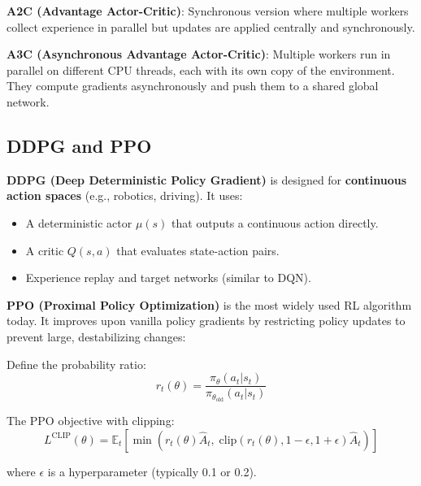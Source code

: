 \documentclass[11pt,a4paper]{article}
\begin{document}
\textbf{A2C (Advantage Actor-Critic)}: Synchronous version where multiple workers collect experience in parallel but updates are applied centrally and synchronously.

\textbf{A3C (Asynchronous Advantage Actor-Critic)}: Multiple workers run in parallel on different CPU threads, each with its own copy of the environment. They compute gradients asynchronously and push them to a shared global network.

\subsection{DDPG and PPO}

\textbf{DDPG (Deep Deterministic Policy Gradient)} is designed for \textbf{continuous action spaces} (e.g., robotics, driving). It uses:
\begin{itemize}
    \item A deterministic actor $\mu(s)$ that outputs a continuous action directly.
    \item A critic $Q(s, a)$ that evaluates state-action pairs.
    \item Experience replay and target networks (similar to DQN).
\end{itemize}

\textbf{PPO (Proximal Policy Optimization)} is the most widely used RL algorithm today. It improves upon vanilla policy gradients by restricting policy updates to prevent large, destabilizing changes:

Define the probability ratio:
\[
r_t(\theta) = \frac{\pi_\theta(a_t | s_t)}{\pi_{\theta_{\text{old}}}(a_t | s_t)}
\]

The PPO objective with clipping:
\[
L^{\text{CLIP}}(\theta) = \mathbb{E}_t \left[ \min\left( r_t(\theta) \hat{A}_t, \; \text{clip}(r_t(\theta), 1 - \epsilon, 1 + \epsilon) \hat{A}_t \right) \right]
\]

where $\epsilon$ is a hyperparameter (typically 0.1 or 0.2).
\end{document}
